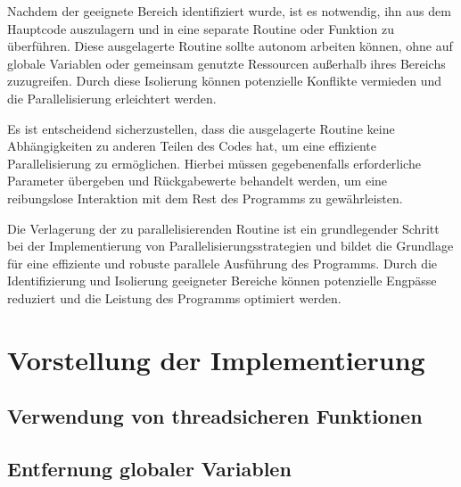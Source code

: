 Nachdem der geeignete Bereich identifiziert wurde, ist es notwendig, ihn aus dem Hauptcode auszulagern und in eine separate Routine oder Funktion zu überführen. Diese ausgelagerte Routine sollte autonom arbeiten können, ohne auf globale Variablen oder gemeinsam genutzte Ressourcen außerhalb ihres Bereichs zuzugreifen. Durch diese Isolierung können potenzielle Konflikte vermieden und die Parallelisierung erleichtert werden.

Es ist entscheidend sicherzustellen, dass die ausgelagerte Routine keine Abhängigkeiten zu anderen Teilen des Codes hat, um eine effiziente Parallelisierung zu ermöglichen. Hierbei müssen gegebenenfalls erforderliche Parameter übergeben und Rückgabewerte behandelt werden, um eine reibungslose Interaktion mit dem Rest des Programms zu gewährleisten.

Die Verlagerung der zu parallelisierenden Routine ist ein grundlegender Schritt bei der Implementierung von Parallelisierungsstrategien und bildet die Grundlage für eine effiziente und robuste parallele Ausführung des Programms. Durch die Identifizierung und Isolierung geeigneter Bereiche können potenzielle Engpässe reduziert und die Leistung des Programms optimiert werden.

\section{Vorstellung der Implementierung}
\label{sec:Vorstellung_Implementierung}

\subsection{Verwendung von threadsicheren Funktionen}
\label{sec:Verwendung_threadsichere_Funktionen}

\subsection{Entfernung globaler Variablen}
\label{sec:Entfernung_globaler_Variablen}